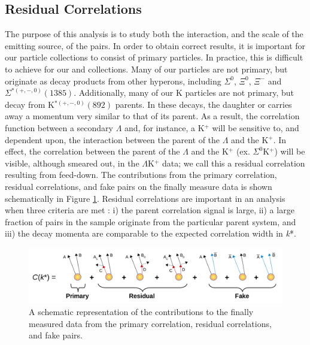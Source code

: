 \documentclass[/home/jesse/Analysis/FemtoAnalysis/AnalysisNotes/AnalysisNoteJBuxton.tex]{subfiles}
\begin{document}
\subsection{Residual Correlations}
\label{ResidualCorrelations}

The purpose of this analysis is to study both the interaction, and the scale of the emitting source, of the pairs.
In order to obtain correct results, it is important for our particle collections to consist of primary particles.
In practice, this is difficult to achieve for our \Lam and \ALam collections.
Many of our \Lam particles are not primary, but originate as decay products from other hyperons, including $\Sigma^{0}$, $\Xi^{0}$, $\Xi^{-}$ and $\Sigma^{*(+,-,0)}(1385)$.  Additionally, many of our K particles are not primary, but decay from K$^{*(+,-,0)}(892)$ parents.
In these decays, the daughter \Lam or \Ks carries away a momentum very similar to that of its parent.
As a result, the correlation function between a secondary $\Lambda$ and, for instance, a K$^{+}$  will be sensitive to, and dependent upon, the interaction between the parent of the $\Lambda$ and the K$^{+}$.
In effect, the correlation between the parent of the $\Lambda$ and the K$^{+}$ (ex. $\Sigma^{0}$K$^{+}$) will be visible, although smeared out, in the $\Lambda$K$^{+}$ data; we call this a residual correlation resulting from feed-down.
The contributions from the primary correlation, residual correlations, and fake pairs on the finally measure data is shown schematically in Figure \ref{fig:ResidualsCartoon}.
Residual correlations are important in an analysis when three criteria are met \cite{Kisiel:2014mma}: i) the parent correlation signal is large, ii) a large fraction of pairs in the sample originate from the particular parent system, and iii) the decay momenta are comparable to the expected correlation width in \textit{k}*. 


\begin{figure}[h]
  \centering
  \includegraphics[width=\textwidth]{5_Fitting/Figures/ResidualCartoons_p3.pdf}
  \caption[Residual Contributions Cartoon]{A schematic representation of the contributions to the finally measured data from the primary correlation, residual correlations, and fake pairs.}
  \label{fig:ResidualsCartoon}
\end{figure}
\end{document}
